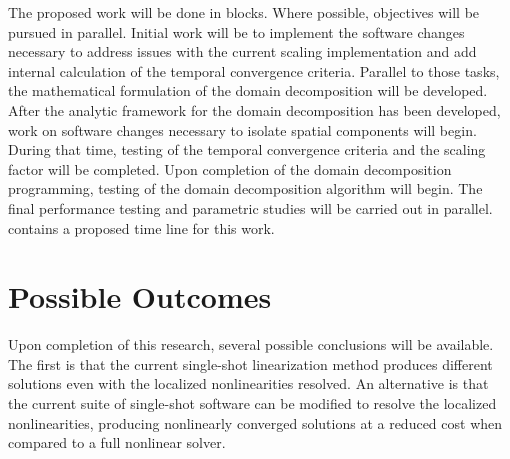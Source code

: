 The proposed work will be done in blocks.
Where possible, objectives will be pursued in parallel.
Initial work will be to implement the software changes necessary to address issues with the current scaling implementation and add internal calculation of the temporal convergence criteria.
Parallel to those tasks, the mathematical formulation of the domain decomposition will be developed.
After the analytic framework for the domain decomposition has been developed, work on software changes necessary to isolate spatial components will begin.
During that time, testing of the temporal convergence criteria and the scaling factor will be completed.
Upon completion of the domain decomposition programming, testing of the domain decomposition algorithm will begin.
The final performance testing and parametric studies will be carried out in parallel.
 contains a proposed time line for this work.

\section{Possible Outcomes}
\label{sect:possible_outcomes}
Upon completion of this research, several possible conclusions will be available.
The first is that the current single-shot linearization method produces different solutions even with the localized nonlinearities resolved.
An alternative is that the current suite of single-shot software can be modified to resolve the localized nonlinearities, producing nonlinearly converged solutions at a reduced cost when compared to a full nonlinear solver.